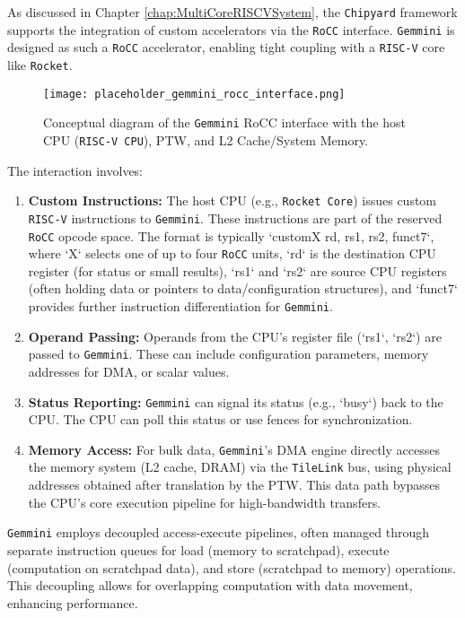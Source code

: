 As discussed in Chapter \ref{chap:MultiCoreRISCVSystem}, the \texttt{Chipyard} framework supports the integration of custom accelerators via the \texttt{RoCC} interface. \texttt{Gemmini} is designed as such a \texttt{RoCC} accelerator, enabling tight coupling with a \texttt{RISC-V} core like \texttt{Rocket}.

\begin{figure}[h!]
    \centering
    \texttt{[image: placeholder\_gemmini\_rocc\_interface.png]}
    \caption{Conceptual diagram of the \texttt{Gemmini} RoCC interface with the host CPU (\texttt{RISC-V CPU}), PTW, and L2 Cache/System Memory.}
    \label{fig:gemmini_rocc_interface}
\end{figure}

The interaction involves:
\begin{enumerate}
    \item \textbf{Custom Instructions:} The host CPU (e.g., \texttt{Rocket Core}) issues custom \texttt{RISC-V} instructions to \texttt{Gemmini}. These instructions are part of the reserved \texttt{RoCC} opcode space. The format is typically `customX rd, rs1, rs2, funct7`, where `X` selects one of up to four \texttt{RoCC} units, `rd` is the destination CPU register (for status or small results), `rs1` and `rs2` are source CPU registers (often holding data or pointers to data/configuration structures), and `funct7` provides further instruction differentiation for \texttt{Gemmini}.
    \item \textbf{Operand Passing:} Operands from the CPU's register file (`rs1`, `rs2`) are passed to \texttt{Gemmini}. These can include configuration parameters, memory addresses for DMA, or scalar values.
    \item \textbf{Status Reporting:} \texttt{Gemmini} can signal its status (e.g., `busy`) back to the CPU. The CPU can poll this status or use fences for synchronization.
    \item \textbf{Memory Access:} For bulk data, \texttt{Gemmini}'s DMA engine directly accesses the memory system (L2 cache, DRAM) via the \texttt{TileLink} bus, using physical addresses obtained after translation by the PTW. This data path bypasses the CPU's core execution pipeline for high-bandwidth transfers.
\end{enumerate}

\texttt{Gemmini} employs decoupled access-execute pipelines, often managed through separate instruction queues for load (memory to scratchpad), execute (computation on scratchpad data), and store (scratchpad to memory) operations. This decoupling allows for overlapping computation with data movement, enhancing performance.

